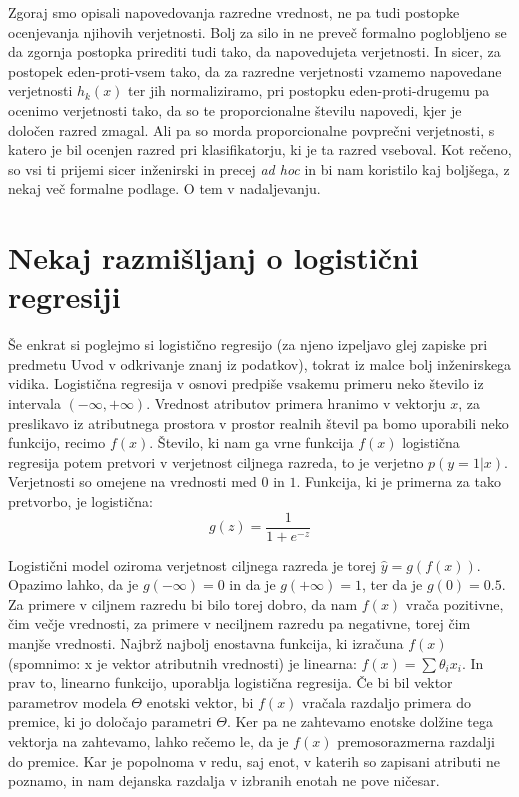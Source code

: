 Zgoraj smo opisali napovedovanja razredne vrednost, ne pa tudi postopke ocenjevanja njihovih verjetnosti. Bolj za silo in ne preveč formalno poglobljeno se da zgornja postopka prirediti tudi tako, da napovedujeta verjetnosti. In sicer, za postopek eden-proti-vsem tako, da za razredne verjetnosti vzamemo napovedane verjetnosti $h_k(x)$ ter jih normaliziramo, pri postopku eden-proti-drugemu pa ocenimo verjetnosti tako, da so te proporcionalne številu napovedi, kjer je določen razred zmagal. Ali pa so morda proporcionalne povprečni verjetnosti, s katero je bil ocenjen razred pri klasifikatorju, ki je ta razred vseboval. Kot rečeno, so vsi ti prijemi sicer inženirski in precej {\em ad hoc} in bi nam koristilo kaj boljšega, z nekaj več formalne podlage. O tem v nadaljevanju.

\section{Nekaj razmišljanj o logistični regresiji}

Še enkrat si poglejmo si logistično regresijo (za njeno izpeljavo glej zapiske pri predmetu Uvod v odkrivanje znanj iz podatkov), tokrat iz malce bolj inženirskega vidika. Logistična regresija v osnovi predpiše vsakemu primeru neko število iz intervala $(-\infty,+\infty)$. Vrednost atributov primera hranimo v vektorju $x$, za preslikavo iz atributnega prostora v prostor realnih števil pa bomo uporabili neko funkcijo, recimo $f(x)$. Število, ki nam ga vrne funkcija $f(x)$ logistična regresija potem pretvori v verjetnost ciljnega razreda, to je verjetno $p(y=1|x)$. Verjetnosti so omejene na vrednosti med $0$ in $1$. Funkcija, ki je primerna za tako pretvorbo, je logistična:
%
$$ g(z)=\frac{1}{1+e^{-z}} $$

Logistični model oziroma verjetnost ciljnega razreda je torej $\hat{y}=g(f(x))$. Opazimo lahko, da je $g(-\infty)=0$ in da je $g(+\infty)=1$, ter da je $g(0)=0.5$. Za primere v ciljnem razredu bi bilo torej dobro, da nam $f(x)$ vrača pozitivne, čim večje vrednosti, za primere v neciljnem razredu pa negativne, torej čim manjše vrednosti. Najbrž najbolj enostavna funkcija, ki izračuna $f(x)$ (spomnimo: x je vektor atributnih vrednosti) je linearna: $f(x)=\sum \theta_i x_i$. In prav to, linearno funkcijo, uporablja logistična regresija. Če bi bil vektor parametrov modela $\Theta$ enotski vektor, bi $f(x)$ vračala razdaljo primera do premice, ki jo določajo parametri $\Theta$. Ker pa ne zahtevamo enotske dolžine tega vektorja na zahtevamo, lahko rečemo le, da je $f(x)$ premosorazmerna razdalji do premice. Kar je popolnoma v redu, saj enot, v katerih so zapisani atributi ne poznamo, in nam dejanska razdalja v izbranih enotah ne pove ničesar.

